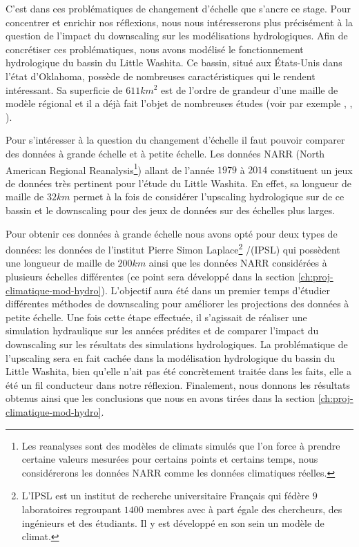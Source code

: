 \documentclass[a4paper,11pt]{article}
\numberwithin{equation}{section}
\begin{document}
C'est dans ces problématiques de changement d'échelle que s'ancre ce stage. Pour concentrer et enrichir nos réflexions, nous nous intéresserons plus précisément à la question de l'impact du downscaling sur les modélisations hydrologiques. Afin de concrétiser ces problématiques, nous avons modélisé le fonctionnement hydrologique du bassin du Little Washita. 
Ce bassin, situé aux États-Unis dans l’état d’Oklahoma, possède de nombreuses caractéristiques qui le rendent intéressant. Sa superficie de $611km^2$ est de l'ordre de grandeur d'une maille de modèle régional et il a déjà fait l'objet de nombreuses études (voir par exemple \cite{maxwell2007groundwater}, \cite{rosero2011ensemble}, \cite{maquin2016developpement}). 

\vspace{0.7cm}

Pour s'intéresser à la question du changement d'échelle il faut pouvoir comparer des données à grande échelle et à petite échelle. Les données NARR (North American Regional Reanalysis\footnote{Les reanalyses sont des modèles de climats simulés que l'on force à prendre certaine valeurs mesurées pour certains points et certains temps, nous considérerons les données NARR comme les données climatiques réelles.}) allant de l'année $1979$ à $2014$ constituent un jeux de données très pertinent pour l'étude du Little Washita. En effet, sa longueur de maille de $32km$ permet à la fois de considérer l'upscaling hydrologique sur de ce bassin et le downscaling pour des jeux de données sur des échelles plus larges.

Pour obtenir ces données à grande échelle nous avons opté pour deux types de données: les données de l'institut Pierre Simon Laplace\footnote{ L'IPSL est un institut de recherche universitaire Français qui fédère $9$ laboratoires regroupant $1400$ membres avec à part égale des chercheurs, des ingénieurs et des étudiants. Il y est développé en son sein un modèle de climat.} /(IPSL) qui possèdent une longueur de maille de $200km$ ainsi que les données NARR considérées à plusieurs échelles différentes (ce point sera développé dans la section \ref{ch:proj-climatique-mod-hydro}).
L'objectif aura été dans un premier temps d'étudier différentes méthodes de downscaling pour améliorer les projections des données à petite échelle. Une fois cette étape effectuée, il s'agissait de réaliser une simulation hydraulique sur les années prédites et de comparer l'impact du downscaling sur les résultats des simulations hydrologiques. La problématique de l'upscaling sera en fait cachée dans la modélisation hydrologique du bassin du Little Washita, bien qu'elle n'ait pas été concrètement traitée dans les faits, elle a été un fil conducteur dans notre réflexion. Finalement, nous donnons les résultats obtenus ainsi que les conclusions que nous en avons tirées dans la section \ref{ch:proj-climatique-mod-hydro}.
\end{document}
